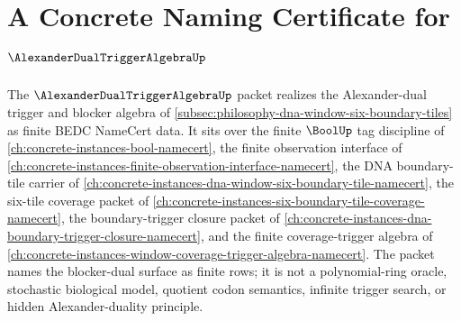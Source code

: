 \chapter{A Concrete Naming Certificate for $\AlexanderDualTriggerAlgebraUp$}
\label{ch:concrete-instances-alexander-dual-trigger-algebra-namecert}

The $\AlexanderDualTriggerAlgebraUp$ packet realizes the Alexander-dual trigger and blocker algebra of \autoref{subsec:philosophy-dna-window-six-boundary-tiles} as finite BEDC NameCert data. It sits over the finite $\BoolUp$ tag discipline of \autoref{ch:concrete-instances-bool-namecert}, the finite observation interface of \autoref{ch:concrete-instances-finite-observation-interface-namecert}, the DNA boundary-tile carrier of \autoref{ch:concrete-instances-dna-window-six-boundary-tile-namecert}, the six-tile coverage packet of \autoref{ch:concrete-instances-six-boundary-tile-coverage-namecert}, the boundary-trigger closure packet of \autoref{ch:concrete-instances-dna-boundary-trigger-closure-namecert}, and the finite coverage-trigger algebra of \autoref{ch:concrete-instances-window-coverage-trigger-algebra-namecert}. The packet names the blocker-dual surface as finite rows; it is not a polynomial-ring oracle, stochastic biological model, quotient codon semantics, infinite trigger search, or hidden Alexander-duality principle.

